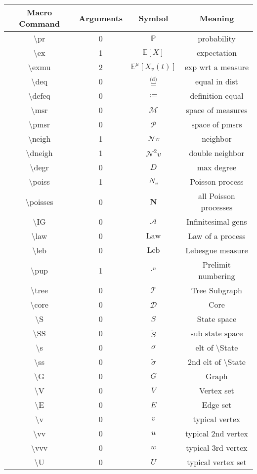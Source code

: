 \documentclass[12pt]{article}
\newcommand{\mb}{\mathbb}
\newcommand{\mc}{\mathcal}
\newcommand{\te}{\text}
\newcommand{\tbs}{\textbackslash}
\newcommand{\pr}{\mb{P}}							%
\newcommand{\ex}[1]{\mb{E}\left[#1\right]}			%
\newcommand{\exmu}[2]{\mb{E}^{#1}\left[#2\right]}	%
\newcommand{\deq}{\overset{\text{(d)}}{=}}			%
\newcommand{\defeq}{:=}								%
\newcommand{\msr}{\mc{M}}							%
\newcommand{\pmsr}{\mc{P}}							%
\newcommand{\neigh}{\mc{N}}					%
\newcommand{\dneigh}{\mc{N}^2}				%
\renewcommand{\v}{v}							%
\newcommand{\vv}{u}								%
\newcommand{\vvv}{w}							%
\renewcommand{\U}{U}							%
\renewcommand{\S}{S}							%
\newcommand{\s}{\sigma}							%
\renewcommand{\t}{t}							%
\newcommand{\degr}{D}								%
\newcommand{\poiss}[1]{N_{#1}}						%
\newcommand{\poisses}{\mathbf{N}}				%
\newcommand{\IG}{\mc{A}}						%
\newcommand{\law}{\te{Law}}							%
\newcommand{\leb}{\te{Leb}}							%
\newcommand{\pup}[1]{^{#1}}							%
\newcommand{\tree}{\mc{T}}							%
\newcommand{\core}{\mc{D}}							%
\renewcommand{\SS}{\tilde{\S}}						%
\renewcommand{\ss}{\tilde{\s}}					%
\renewcommand{\G}{G}								%
\newcommand{\V}{V}									%
\newcommand{\E}{E}									%
\newcommand{\rxvt}[2]{X_{#1}{(#2)}}					%
\newcommand{\m}[3]{\mu_{#2#1}^{#3}}						%
\begin{document}
\begin{longtable}{c|c|c|c}
Macro Command & Arguments & Symbol & Meaning\\\hline
\tbs pr&0&\(\pr\)	& probability\\
\tbs ex&1&\(\ex{X}\)	&expectation\\
\tbs exmu&2&\(\exmu{\m{}{}{}}{\rxvt{\v}{\t}}\)	&exp wrt a measure\\
\tbs deq&0&\(\deq\)		&equal in dist\\
\tbs defeq&0&\(\defeq\)							&definition equal\\
\tbs msr&0&\(\msr\)							&space of measures\\
\tbs pmsr&0&\(\pmsr\)						&space of pmsrs\\
\tbs neigh&1&\(\neigh{\v}\)				&neighbor\\
\tbs dneigh&1&\(\dneigh{\v}\)				&double neighbor\\
\tbs degr&0&\(\degr\)								&max degree\\
\tbs poiss&1&\(\poiss{\v}\)						&Poisson process\\
\tbs poisses&0&\(\poisses\)					&all Poisson processes\\
\tbs IG&0&\(\IG\)					&Infinitesimal gens\\
\tbs law&0&\(\law\)							&Law of a process\\
\tbs leb&0&\(\leb\)							&Lebesgue measure\\
\tbs pup&1&\(\cdot\pup{n}\)						&Prelimit numbering\\
\tbs tree&0&\(\tree\)							&Tree Subgraph\\
\tbs core&0&\(\core\)							&Core\\
\tbs S&0&\(\S\)							&State space\\
\tbs SS&0&\(\SS\)						&sub state space\\
\tbs s&0&\(\s\)								&elt of \tbs State\\
\tbs ss&0&\(\ss\)						&2nd elt of \tbs State\\
\tbs G&0&\(\G\)								&Graph\\
\tbs V&0&\(\V\)									&Vertex set\\
\tbs E&0&\(\E\)									&Edge set\\
\tbs v&0&\(\v\)								&typical vertex\\
\tbs vv&0&\(\vv\)									&typical 2nd vertex\\
\tbs vvv&0&\(\vvv\)								&typical 3rd vertex\\
\tbs U&0&\(\U\)									&typical vertex set\\

\end{longtable}
\end{document}
